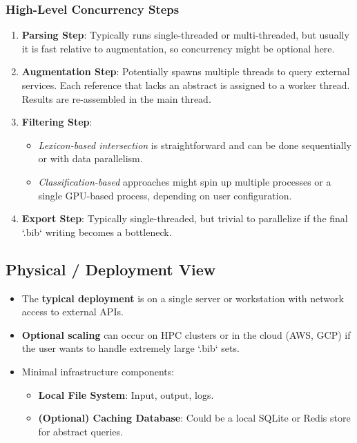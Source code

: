 \documentclass[12pt]{article}
\begin{document}
\subsubsection{High-Level Concurrency Steps}
\begin{enumerate}
  \item \textbf{Parsing Step}: Typically runs single-threaded or multi-threaded, but usually it is fast relative to augmentation, so concurrency might be optional here.
  \item \textbf{Augmentation Step}: Potentially spawns multiple threads to query external services. Each reference that lacks an abstract is assigned to a worker thread. Results are re-assembled in the main thread. 
  \item \textbf{Filtering Step}: 
  \begin{itemize}
    \item \emph{Lexicon-based intersection} is straightforward and can be done sequentially or with data parallelism. 
    \item \emph{Classification-based} approaches might spin up multiple processes or a single GPU-based process, depending on user configuration.
  \end{itemize}
  \item \textbf{Export Step}: Typically single-threaded, but trivial to parallelize if the final `.bib` writing becomes a bottleneck.
\end{enumerate}

\subsection{Physical / Deployment View}
\begin{itemize}
  \item The \textbf{typical deployment} is on a single server or workstation with network access to external APIs. 
  \item \textbf{Optional scaling} can occur on HPC clusters or in the cloud (AWS, GCP) if the user wants to handle extremely large `.bib` sets. 
  \item Minimal infrastructure components:
    \begin{itemize}
      \item \textbf{Local File System}: Input, output, logs.
      \item \textbf{(Optional) Caching Database}: Could be a local SQLite or Redis store for abstract queries.
    \end{itemize}
\end{itemize}
\end{document}

